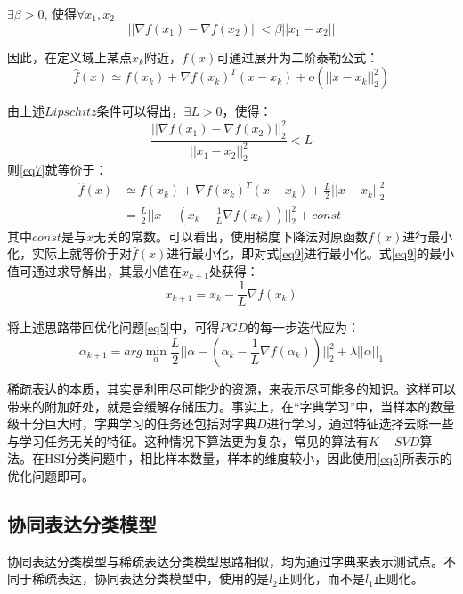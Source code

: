\documentclass[12pt,a4paper]{article}
\begin{document}
\begin{definition}
$\exists \beta > 0$, 使得$\forall x_{1}, x_{2}$\\
\begin{equation*}
||\nabla f(x_{1}) - \nabla f(x_{2})|| < \beta ||x_{1} - x_{2}||
\end{equation*}
\end{definition}

因此，在定义域上某点$x_{k}$附近，$f(x)$可通过展开为二阶泰勒公式：
\begin{equation}
\label{eq7}
\hat{f}(x) \simeq f(x_{k}) + \nabla f(x_{k})^{T}(x - x_{k}) + o(||x - x_{k}||_{2}^{2})
\end{equation}

由上述$Lipschitz$条件可以得出，$\exists L > 0$，使得：
\begin{equation*}
\frac{||\nabla f(x_{1}) - \nabla f(x_{2})||_{2}^{2}}{||x_{1} - x_{2}||_{2}^{2}} < L
\end{equation*}
则\eqref{eq7}就等价于：
\begin{align}
\hat{f}(x) & \simeq f(x_{k}) + \nabla f(x_{k})^{T}(x - x_{k}) + \frac{L}{2}||x - x_{k}||_{2}^{2} \label{eq8}\\
	& = \frac{L}{2}||x - (x_{k} - \frac{1}{L} \nabla f(x_{k}))||_{2}^{2} + const \label{eq9}
\end{align}
其中$const$是与$x$无关的常数。可以看出，使用梯度下降法对原函数$f(x)$进行最小化，实际上就等价于对$\hat{f}(x)$进行最小化，即对式\eqref{eq9}进行最小化。式\eqref{eq9}的最小值可通过求导解出，其最小值在$x_{k + 1}$处获得：
\begin{equation*}
x_{k + 1} = x_{k} - \frac{1}{L} \nabla f(x_{k})
\end{equation*}

将上述思路带回优化问题\eqref{eq5}中，可得$PGD$的每一步迭代应为：
\begin{equation}
\label{eq10}
\alpha_{k + 1} = arg\min_{\alpha} \frac{L}{2}||\alpha - (\alpha_{k} - \frac{1}{L} \nabla f(\alpha_{k}))||_{2}^{2} + \lambda ||\alpha||_{1}
\end{equation}


稀疏表达的本质，其实是利用尽可能少的资源，来表示尽可能多的知识。这样可以带来的附加好处，就是会缓解存储压力。事实上，在“字典学习”中，当样本的数量级十分巨大时，字典学习的任务还包括对字典$D$进行学习，通过特征选择去除一些与学习任务无关的特征。这种情况下算法更为复杂，常见的算法有$K-SVD$算法。在HSI分类问题中，相比样本数量，样本的维度较小，因此使用\eqref{eq5}所表示的优化问题即可。


\subsection{协同表达分类模型}
协同表达分类模型与稀疏表达分类模型思路相似，均为通过字典来表示测试点。不同于稀疏表达，协同表达分类模型中，使用的是$l_{2}$正则化，而不是$l_{1}$正则化。
\end{document}
